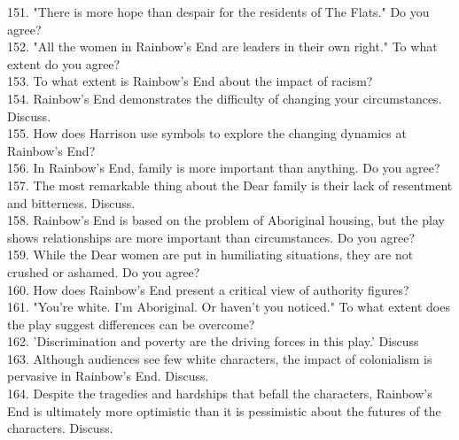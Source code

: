 \documentclass[a4paper]{article}
\begin{document}
151. "There is more hope than despair for the residents of The Flats." Do you agree?\\

152. "All the women in Rainbow's End are leaders in their own right." To what extent do you agree?\\

153. To what extent is Rainbow's End about the impact of racism?\\

154. Rainbow's End demonstrates the difficulty of changing your circumstances. Discuss.\\

155. How does Harrison use symbols to explore the changing dynamics at Rainbow's End?\\

156. In Rainbow's End, family is more important than anything. Do you agree?\\

157. The most remarkable thing about the Dear family is their lack of resentment and bitterness. Discuss.\\

158. Rainbow's End is based on the problem of Aboriginal housing, but the play shows relationships are more important than circumstances. Do you agree?\\

159. While the Dear women are put in humiliating situations, they are not crushed or ashamed. Do you agree?\\

160. How does Rainbow's End present a critical view of authority figures?\\

161. "You're white. I'm Aboriginal. Or haven't you noticed." To what extent does the play suggest differences can be overcome?\\

162. 'Discrimination and poverty are the driving forces in this play.' Discuss\\

163. Although audiences see few white characters, the impact of colonialism is pervasive in Rainbow's End. Discuss.\\

164. Despite the tragedies and hardships that befall the characters, Rainbow's End is ultimately more optimistic than it is pessimistic about the futures of the characters. Discuss.\\
\end{document}
